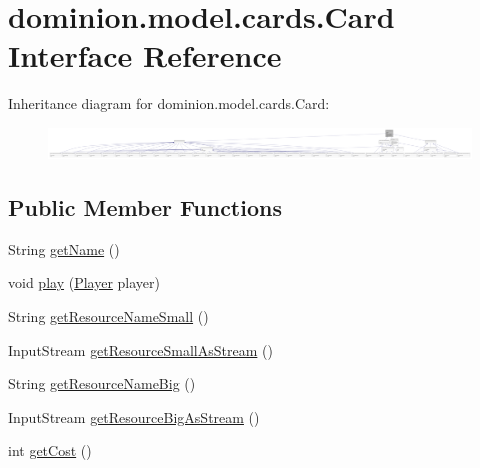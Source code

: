 \hypertarget{interfacedominion_1_1model_1_1cards_1_1Card}{\section{dominion.\-model.\-cards.\-Card \-Interface \-Reference}
\label{interfacedominion_1_1model_1_1cards_1_1Card}
}


\-Inheritance diagram for dominion.\-model.\-cards.\-Card\-:
\nopagebreak
\begin{figure}[H]
\begin{center}
\leavevmode
\includegraphics[width=350pt]{interfacedominion_1_1model_1_1cards_1_1Card__inherit__graph}
\end{center}
\end{figure}
\subsection*{\-Public \-Member \-Functions}
\begin{DoxyCompactItemize}
\item 
\-String \hyperlink{interfacedominion_1_1model_1_1cards_1_1Card_a46947a24ff9a1ef6a3347e24f59fddac}{get\-Name} ()
\item 
void \hyperlink{interfacedominion_1_1model_1_1cards_1_1Card_aef6c9822fa14a6180f84aa9374fc9e86}{play} (\hyperlink{interfacedominion_1_1model_1_1Player}{\-Player} player)
\item 
\-String \hyperlink{interfacedominion_1_1model_1_1cards_1_1Card_af0ff17b1a15dca9c53d9cc9c330087e7}{get\-Resource\-Name\-Small} ()
\item 
\-Input\-Stream \hyperlink{interfacedominion_1_1model_1_1cards_1_1Card_ad9695d80f23cb02e8a6f0c8525cbc27e}{get\-Resource\-Small\-As\-Stream} ()
\item 
\-String \hyperlink{interfacedominion_1_1model_1_1cards_1_1Card_aa87024f27fccf4c02b19b68c5ac2d741}{get\-Resource\-Name\-Big} ()
\item 
\-Input\-Stream \hyperlink{interfacedominion_1_1model_1_1cards_1_1Card_af9254dfd7c959abc5c6018707efd961d}{get\-Resource\-Big\-As\-Stream} ()
\item 
int \hyperlink{interfacedominion_1_1model_1_1cards_1_1Card_a65a61a0f26c597dc5d0da21f87761b39}{get\-Cost} ()
\end{DoxyCompactItemize}



